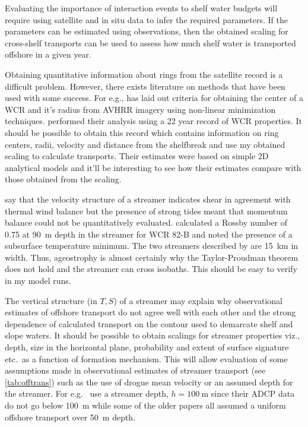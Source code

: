 Evaluating the importance of interaction events to shelf water budgets will require using satellite and in situ data to infer the required parameters. If the parameters can be estimated using observations, then the obtained scaling for cross-shelf transports can be used to assess how much shelf water is transported offshore in a given year. 


Obtaining quantitative information about rings from the satellite record is a difficult problem. However, there exists literature on methods that have been used with some success. For e.g.,\cite{Wei2008} has laid out criteria for obtaining the center of a WCR and it’s radius from AVHRR imagery using non-linear minimization techniques. \cite{Chaudhuri2009} performed their analysis using a 22 year record of WCR properties. It should be possible to obtain this record which contains information on ring centers, radii, velocity and distance from the shelfbreak and use my obtained scaling to calculate transports. Their estimates were based on simple 2D analytical models and it’ll be interesting to see how their estimates compare with those obtained from the scaling.


\cite{Lee2010} say that the velocity structure of a streamer indicates shear in agreement with thermal wind balance but the presence of strong tides meant that momentum balance could not be quantitatively evaluated. \cite{Joyce1992} calculated a Rossby number of 0.75 at \SI{90}{m} depth in the streamer for WCR 82-B and noted the presence of a subsurface temperature minimum. The two streamers described by \cite{Ramp1986} are \SI{15}{\km} in width. Thus, ageostrophy is almost certainly  why the Taylor-Proudman theorem does not hold and the streamer can cross isobaths. This should be easy to verify in my model runs.

 The vertical structure (in $T,S$) of a streamer may explain why observational estimates of offshore transport do not agree well with each other and the strong dependence of calculated transport on the contour used to demarcate shelf and slope waters. It should be possible to obtain scalings for streamer properties viz., depth, size in the horizontal plane, probability and extent of surface signature etc.\ as a function of formation mechanism. This will allow evaluation of some assumptions made in observational estimates of streamer transport (see \cref{tab:offtrans}) such as the use of drogue mean velocity or an assumed depth for the streamer. For e.g.\ \cite{Wei2008} use a streamer depth, $h=\SI{100}{\m}$ since their ADCP data do not go below \SI{100}{\m} while some of the older papers \citep[e.g. ][]{Morgan1977,Smith1978a,Bisagni1983} all assumed a uniform offshore transport over \SI{50}{\m} depth.


